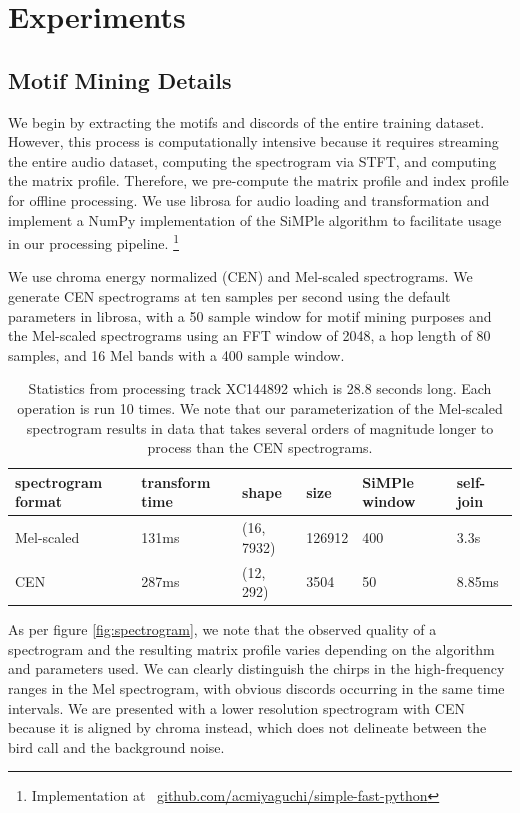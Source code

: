\documentclass[
]{ceurart}
\begin{document}
\section{Experiments}

\subsection{Motif Mining Details}

We begin by extracting the motifs and discords of the entire training dataset. However, this process is computationally intensive because it requires streaming the entire audio dataset, computing the spectrogram via STFT, and computing the matrix profile. Therefore, we pre-compute the matrix profile and index profile for offline processing. We use librosa \cite{librosa} for audio loading and transformation and implement a NumPy implementation of the SiMPle algorithm to facilitate usage in our processing pipeline. \footnote{Implementation at \
\href{https://github.com/acmiyaguchi/simple-fast-python}{github.com/acmiyaguchi/simple-fast-python}}

We use chroma energy normalized (CEN) and Mel-scaled spectrograms. We generate CEN spectrograms at ten samples per second using the default parameters in librosa, with a 50 sample window for motif mining purposes and the Mel-scaled spectrograms using an FFT window of 2048, a hop length of 80 samples, and 16 Mel bands with a 400 sample window.

\begin{table}[]
\begin{tabular}{|l|l|l|l|l|l|}
\hline
spectrogram format & transform time & shape      & size   & SiMPle window & self-join \\ \hline
Mel-scaled         & 131ms          & (16, 7932) & 126912 & 400           & 3.3s      \\ \hline
CEN                & 287ms          & (12, 292)  & 3504   & 50            & 8.85ms    \\ \hline
\end{tabular}
\caption{Statistics from processing track XC144892 which is 28.8 seconds long. Each operation is run 10 times. We note that our parameterization of the Mel-scaled spectrogram results in data that takes several orders of magnitude longer to process than the CEN spectrograms.}
\label{tab:spectrogram}
\end{table}

As per figure \ref{fig:spectrogram}, we note that the observed quality of a spectrogram and the resulting matrix profile varies depending on the algorithm and parameters used. We can clearly distinguish the chirps in the high-frequency ranges in the Mel spectrogram, with obvious discords occurring in the same time intervals. We are presented with a lower resolution spectrogram with CEN because it is aligned by chroma instead, which does not delineate between the bird call and the background noise.
\end{document}
